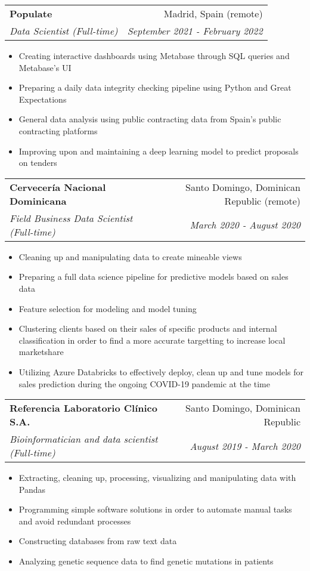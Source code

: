 \documentclass[a4paper,20pt]{article}
\makeatletter
\newcommand{\resumeSubheading}[4]{
  \vspace{-1pt}\item
    \begin{tabular*}{0.97\textwidth}{l@{\extracolsep{\fill}}r}
      \textbf{#1} & #2 \\
      \textit{#3} & \textit{#4} \\
    \end{tabular*}\vspace{-5pt}
}
\makeatother
\begin{document}
  \resumeSubheading{Populate}{Madrid, Spain (remote)}
    {Data Scientist (Full-time)}{September 2021 - February 2022}
\begin{itemize} \itemsep-0.24em
  \item Creating interactive dashboards using Metabase through SQL queries and Metabase's UI
  \item Preparing a daily data integrity checking pipeline using Python and Great Expectations
  \item General data analysis using public contracting data from Spain's public contracting platforms
  \item Improving upon and maintaining a deep learning model to predict proposals on tenders
\end{itemize}
\vspace{-4.2pt}
  \resumeSubheading{Cervecería Nacional Dominicana}{Santo Domingo, Dominican Republic (remote)}
    {Field Business Data Scientist (Full-time)}{March 2020 - August 2020}
\begin{itemize} \itemsep-0.24em
  \item Cleaning up and manipulating data to create mineable views
  \item Preparing a full data science pipeline for predictive models based on sales data
  \item Feature selection for modeling and model tuning
  \item Clustering clients based on their sales of specific products and internal classification in order to find a more accurate targetting to increase local marketshare
  \item Utilizing Azure Databricks to effectively deploy, clean up and tune models for sales prediction during the ongoing COVID-19 pandemic at the time
\end{itemize}
\vspace{-4.2pt}
  \resumeSubheading{Referencia Laboratorio Clínico S.A.}{Santo Domingo, Dominican Republic}
    {Bioinformatician and data scientist (Full-time)}{August 2019 - March 2020}
\begin{itemize} \itemsep-0.24em
  \item Extracting, cleaning up, processing, visualizing and manipulating data with Pandas
  \item Programming simple software solutions in order to automate manual tasks and avoid redundant processes
  \item Constructing databases from raw text data
  \item Analyzing genetic sequence data to find genetic mutations in patients
\end{itemize}
\end{document}
